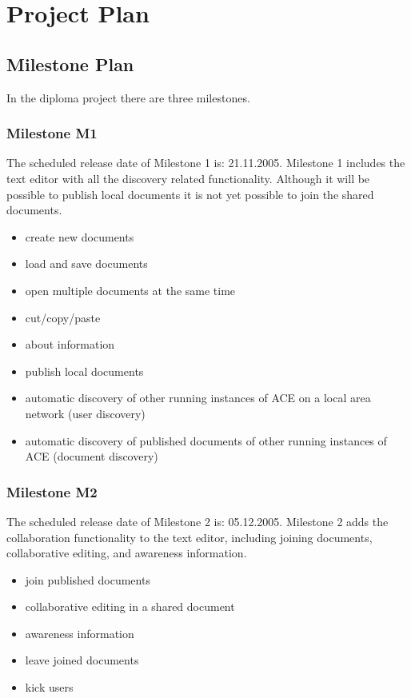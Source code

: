 \documentclass[11pt,a4paper]{article}
\begin{document}
\section{Project Plan}

\subsection{Milestone Plan}

In the diploma project there are three milestones.

\subsubsection{Milestone M1}

The scheduled release date of Milestone 1 is: 21.11.2005. Milestone 1 includes the text editor with
all the discovery related functionality. Although it will be possible to publish local documents
it is not yet possible to join the shared documents.

\begin{itemize}
 \item create new documents
 \item load and save documents
 \item open multiple documents at the same time
 \item cut/copy/paste
 \item about information
 \item publish local documents
 \item automatic discovery of other running instances of ACE on a local area network (user discovery)
 \item automatic discovery of published documents of other running instances of ACE (document discovery)
\end{itemize}

\subsubsection{Milestone M2}

The scheduled release date of Milestone 2 is: 05.12.2005. Milestone 2 adds the collaboration functionality
to the text editor, including joining documents, collaborative editing, and awareness information.

\begin{itemize}
 \item join published documents
 \item collaborative editing in a shared document
 \item awareness information
 \item leave joined documents
 \item kick users
\end{itemize}
\end{document}
